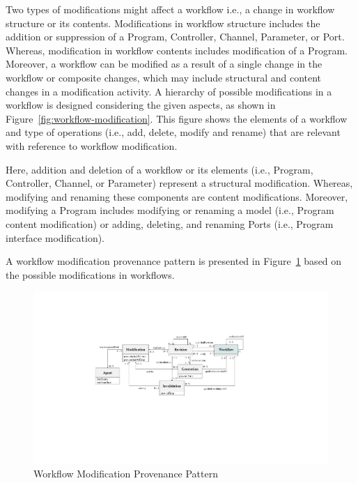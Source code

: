 \documentclass[ao]{iosart2x}
\begin{document}
Two types of modifications might affect a workflow i.e., a change in workflow structure or its contents. Modifications in workflow structure includes the addition or suppression of a Program, Controller, Channel, Parameter, or Port. 
Whereas, modification in workflow contents includes modification of a Program. 
Moreover, a workflow can be modified as a result of a single change in the workflow or composite changes, which may include structural and content changes in a modification activity. A hierarchy of possible modifications in a workflow is designed considering the given aspects, as shown in Figure~\ref{fig:workflow-modification}.  This figure shows the elements of a workflow and type of operations (i.e., add, delete, modify and rename) that are relevant with reference to workflow modification.

Here, addition and deletion of a workflow or its elements (i.e., Program, Controller, Channel, or Parameter) represent a structural modification. Whereas, modifying and renaming these components are content modifications. Moreover, modifying a Program includes modifying or renaming a model (i.e., Program content modification) or adding, deleting, and renaming Ports (i.e., Program interface modification).

A workflow modification provenance pattern is presented in Figure~\ref{fig:workflow-modification-provenance} based on the possible modifications in workflows. 

\begin{figure}[h]
    \centering
    \includegraphics[width=0.95\linewidth]{figures/workflow-modification-pattern.pdf}
    \caption{Workflow Modification Provenance Pattern}
    \label{fig:workflow-modification-provenance}
\end{figure}
\end{document}

